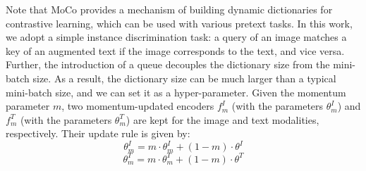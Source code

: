 \documentclass[10pt,twocolumn,letterpaper]{article}
\begin{document}
Note that MoCo provides a mechanism of building dynamic dictionaries for contrastive learning, which can be used with various pretext tasks. In this work, we adopt a simple instance discrimination task: a query of an image matches a key of an augmented text if the image corresponds to the text, and vice versa. Further, the introduction of a queue decouples the dictionary size from the mini-batch size. As a result, the dictionary size can be much larger than a typical mini-batch size, and we can set it as a hyper-parameter. Given the momentum parameter $m$, two momentum-updated encoders $f^{I}_m$ (with the parameters $\theta^{I}_m$) and $f^{T}_m$ (with the parameters $\theta^{T}_m$) are kept for the image and text modalities, respectively. Their update rule is given by:
\begin{equation}
\theta^I_m = m\cdot\theta^I_m+(1-m)\cdot\theta^I
\end{equation}
\begin{equation}
\theta^T_m = m\cdot\theta^T_m+(1-m)\cdot\theta^T
\end{equation}
\end{document}
